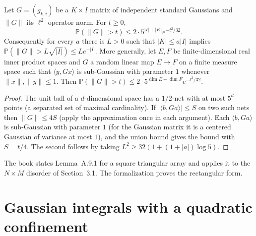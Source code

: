 \begin{lemma}\label{lem:sg-tal:st-gaussian-norm}
  \leanok
{}
Let $G=(g_{k,i})$ be a $K\times I$ matrix of independent standard Gaussians and $\|G\|$ its $\ell^2$
operator norm. For $t\ge0$,
\[
\mathbb P(\|G\|>t)\le2\cdot5^{|I|+|K|}e^{-t^2/32}.
\]
Consequently for every $a$ there is $L>0$ such that $|K|\le a|I|$ implies
$\mathbb P(\|G\|>L\sqrt{|I|})\le Le^{-|I|}$.
More generally, let $E,F$ be finite-dimensional real inner product spaces and $G$ a random linear map $E\to F$ on a finite
measure space such that $\langle y,Gx\rangle$ is sub-Gaussian with parameter $1$ whenever $\|x\|,\|y\|\le1$. Then
$\mathbb P(\|G\|>t)\le2\cdot5^{\dim E+\dim F}e^{-t^2/32}$.
\end{lemma}
\begin{proof}
  \leanok
The unit ball of a $d$-dimensional space has a $1/2$-net with at most $5^d$ points (a separated set of
maximal cardinality). If $|\langle b,Ga\rangle|\le S$ on two such nets then $\|G\|\le4S$ (apply the
approximation once in each argument). Each $\langle b,Ga\rangle$ is sub-Gaussian with parameter $1$ (for the Gaussian
matrix it is a centered Gaussian of variance at most $1$), and the union bound gives the bound with $S=t/4$. The second follows by taking
$L^2\ge32(1+(1+|a|)\log5)$.
\end{proof}

\begin{remark}\label{rem:sg-tal:st-gaussian-norm}
The book states Lemma~A.9.1 for a square triangular array and applies it to the $N\times M$ disorder of
Section~3.1. The formalization proves the rectangular form.
\end{remark}

\section{Gaussian integrals with a quadratic confinement}\label{sec:sg-tal:st-quadratic}


